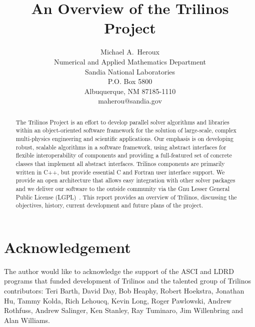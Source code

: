 \documentclass[12pt,relax]{SANDreport}
\title{An Overview of the Trilinos Project}
\author{Michael A.~Heroux\\
       Numerical and Applied Mathematics Department \\
	  Sandia National Laboratories\\
	  P.O. Box 5800\\
	  Albuquerque, NM 87185-1110 \\
	  maherou@sandia.gov \\
	 }
\date{}
\begin{document}
    \maketitle

    \begin{abstract}
The Trilinos Project is an effort to develop parallel solver algorithms and libraries 
within 
an object-oriented software framework for the solution of large-scale, complex
multi-physics engineering and scientific applications.   Our emphasis is on 
developing robust, scalable algorithms in a software framework, using abstract 
interfaces for flexible interoperability of components and providing a 
full-featured set of concrete classes that implement all abstract interfaces. 
Trilinos components are primarily written in C++, but provide essential C and 
Fortran user interface support.  We provide an open architecture that allows 
easy integration with other solver packages and we deliver our software to 
the outside community via the Gnu Lesser General Public License
(LGPL)~\cite{gnu-license-site}.
This report provides an overview of Trilinos, discussing the objectives, history,
current development and future plans of the project.
    \end{abstract}


    \clearpage
    \section*{Acknowledgement}
The author would like to acknowledge the support of the ASCI and LDRD programs
that funded development of Trilinos and the talented group of Trilinos contributors: 
Teri Barth, David Day, Bob Heaphy, Robert Hoekstra, Jonathan Hu, Tammy Kolda, Rich Lehoucq,
Kevin Long, Roger Pawlowski, Andrew Rothfuss, Andrew Salinger, Ken Stanley, Ray Tuminaro,
Jim Willenbring and Alan Williams.



    \clearpage
    \tableofcontents
    \listoffigures
    \listoftables
\end{document}
